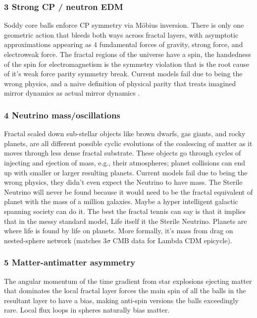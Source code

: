 \documentclass[11pt,a4paper]{article}
\begin{document}
\subsubsection{
3 Strong CP / neutron EDM 
}
Soddy core balls enforce CP symmetry via Möbius inversion. There is only one geometric action that bleeds both ways across fractal layers, with asymptotic approximations appearing as 4 fundamental forces of gravity, strong force, and electroweak force. The fractal regions of the universe have a spin, the handedness of the spin for electromagnetism is the symmetry violation that is the root cause of it's weak force parity symmetry break. Current models fail due to being the wrong physics, and a naive definition of physical parity that treats imagined mirror dynamics as actual mirror dynamics .

\subsubsection{
4 Neutrino mass/oscillations 
}
Fractal scaled down sub-stellar objects like brown dwarfs, gas giants, and rocky planets, are all different possible cyclic evolutions of the coalescing of matter as it moves through less dense fractal substrate. These objects go through cycles of injecting and ejection of mass, e.g., their atmospheres; planet collisions can end up with smaller or larger resulting planets. Current models fail due to being the wrong physics, they didn't even expect the Neutrino to have mass. The Sterile Neutrino will never be found because it would need to be the fractal equivalent of planet with the mass of a million galaxies. Maybe a hyper intelligent galactic spanning society can do it. The best the fractal tennis can say is that it implies that in the messy standard model, Life itself it the Sterile Neutrino. Planets are where life is found by life on planets. More formally, it's mass from drag on nested-sphere network (matches 3$\sigma$ CMB data for Lambda CDM epicycle).

\subsubsection{
5 Matter-antimatter asymmetry
}
The angular momentum of the time gradient from star explosions ejecting matter that dominates the local fractal layer forces the main spin of all the balls in the resultant layer to have a bias, making anti-spin versions the balls exceedingly rare.
Local flux loops in spheres naturally bias matter.
\end{document}
